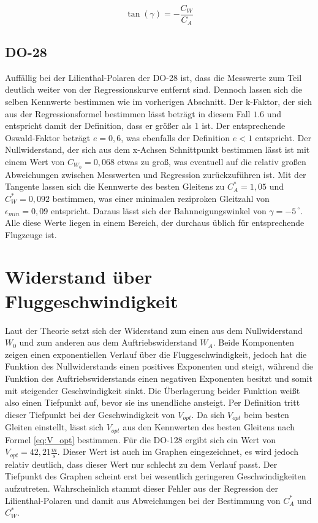 \begin{equation}
\tan\left(\gamma\right)=-\frac{C_W}{C_A}
\label{Bahn}
\end{equation}

\subsection{DO-28}

Auffällig bei der Lilienthal-Polaren der DO-28 ist, dass die Messwerte zum Teil deutlich weiter von der Regressionskurve entfernt sind. Dennoch lassen sich die selben Kennwerte bestimmen wie im vorherigen Abschnitt. 
Der k-Faktor, der sich aus der Regressionsformel bestimmen lässt beträgt in diesem Fall $1.6$ und entspricht damit der Definition, dass er größer als 1 ist. Der entsprechende Oswald-Faktor beträgt $e = 0,6$, was ebenfalls der Definition $e<1$ entspricht. 
Der Nullwiderstand, der sich aus dem x-Achsen Schnittpunkt bestimmen lässt ist mit einem Wert von $C_W_0 = 0,068$ etwas zu groß, was eventuell auf die relativ großen Abweichungen zwischen Messwerten und Regression zurückzuführen ist.
Mit der Tangente lassen sich die Kennwerte des besten Gleitens zu $C_A^* = 1,05$ und $C_W^* = 0,092$ bestimmen, was einer minimalen reziproken Gleitzahl von $\epsilon_{min} = 0,09$ entspricht. Daraus lässt sich der Bahnneigungswinkel von $\gamma = -5^{\ \circ}$. Alle diese Werte liegen in einem Bereich, der durchaus üblich für entsprechende Flugzeuge ist.


\section{Widerstand über Fluggeschwindigkeit}
Laut der Theorie setzt sich der Widerstand zum einen aus dem Nullwiderstand $W_0$ und zum anderen aus dem Auftriebswiderstand $W_A$. Beide Komponenten zeigen einen exponentiellen Verlauf über die Fluggeschwindigkeit, jedoch hat die Funktion des Nullwiderstands einen positives Exponenten und steigt, während die Funktion des Auftriebswiderstands einen negativen Exponenten besitzt und somit mit steigender Geschwindigkeit sinkt. Die Überlagerung beider Funktion weißt also einen Tiefpunkt auf, bevor sie ins unendliche ansteigt. Per Definition tritt dieser Tiefpunkt bei der Geschwindigkeit von $V_{opt}$. Da sich $V_{opt}$ beim besten Gleiten einstellt, lässt sich $V_{opt}$ aus den Kennwerten des besten Gleitens nach Formel \ref{eq:V_opt} bestimmen. Für die DO-128 ergibt sich ein Wert von $V_{opt} = 42,21 \frac{m}{s}$. Dieser Wert ist auch im Graphen eingezeichnet, es wird jedoch relativ deutlich, dass dieser Wert nur schlecht zu dem Verlauf passt. Der Tiefpunkt des Graphen scheint erst bei wesentlich geringeren Geschwindigkeiten aufzutreten. Wahrscheinlich stammt dieser Fehler aus der Regression der Lilienthal-Polaren und damit aus Abweichungen bei der Bestimmung von $C_A^*$ und $C_W^*$.

